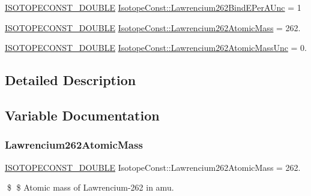 \begin{DoxyCompactItemize}
\mbox{\hyperlink{group___isotope_const-_macros_ga8f45a7272ce02c0b4c65c44636ed719a}{I\+S\+O\+T\+O\+P\+E\+C\+O\+N\+S\+T\+\_\+\+D\+O\+U\+B\+LE}} \mbox{\hyperlink{group___isotope_const-_lawrencium-_lr262_gadbf02d2c44bc1a8c8cae059001253ac3}{Isotope\+Const\+::\+Lawrencium262\+Bind\+E\+Per\+A\+Unc}} = 1
\item 
\mbox{\hyperlink{group___isotope_const-_macros_ga8f45a7272ce02c0b4c65c44636ed719a}{I\+S\+O\+T\+O\+P\+E\+C\+O\+N\+S\+T\+\_\+\+D\+O\+U\+B\+LE}} \mbox{\hyperlink{group___isotope_const-_lawrencium-_lr262_ga477cb97098ce990bcfbf6cd59aa4a337}{Isotope\+Const\+::\+Lawrencium262\+Atomic\+Mass}} = 262.
\item 
\mbox{\hyperlink{group___isotope_const-_macros_ga8f45a7272ce02c0b4c65c44636ed719a}{I\+S\+O\+T\+O\+P\+E\+C\+O\+N\+S\+T\+\_\+\+D\+O\+U\+B\+LE}} \mbox{\hyperlink{group___isotope_const-_lawrencium-_lr262_ga98e3c24e91cf177bf03222dcfe6ba99b}{Isotope\+Const\+::\+Lawrencium262\+Atomic\+Mass\+Unc}} = 0.
\end{DoxyCompactItemize}


\subsection{Detailed Description}


\subsection{Variable Documentation}
\mbox{\label{group___isotope_const-_lawrencium-_lr262_ga477cb97098ce990bcfbf6cd59aa4a337}} 
\subsubsection{\texorpdfstring{Lawrencium262\+Atomic\+Mass}{Lawrencium262AtomicMass}}
{\footnotesize\ttfamily \mbox{\hyperlink{group___isotope_const-_macros_ga8f45a7272ce02c0b4c65c44636ed719a}{I\+S\+O\+T\+O\+P\+E\+C\+O\+N\+S\+T\+\_\+\+D\+O\+U\+B\+LE}} Isotope\+Const\+::\+Lawrencium262\+Atomic\+Mass = 262.}

\$ \$ Atomic mass of Lawrencium-\/262 in amu. \mbox{\label{group___isotope_const-_lawrencium-_lr262_ga98e3c24e91cf177bf03222dcfe6ba99b}} 
